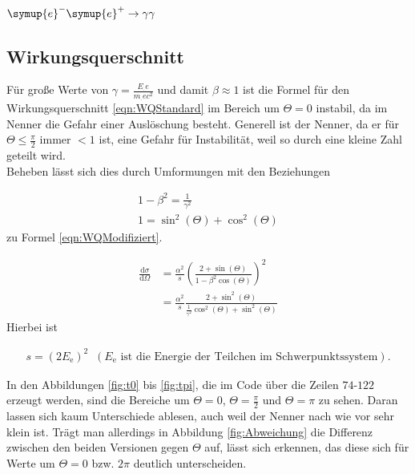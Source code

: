 \newpage

\section{\texorpdfstring{$\symup{e}^-\symup{e}^+\rightarrow\gamma \gamma$}{Paarvernichtung}}
\subsection{Wirkungsquerschnitt}
Für große Werte von $\gamma=\frac{E_.e}{m_.ec^2}$ und damit $\beta\approx 1$ ist die Formel für den Wirkungsquerschnitt \eqref{eqn:WQStandard} im Bereich um $\Theta=0$ instabil, da im Nenner die Gefahr einer Auslöschung besteht. Generell ist der Nenner, da er für $\Theta\leq \frac{\pi}{2}$ immer $<1$ ist, eine Gefahr für Instabilität, weil so durch eine kleine Zahl geteilt wird.\\
Beheben lässt sich dies durch Umformungen mit den Beziehungen

\begin{gather}
  1-\beta^2=\frac{1}{\gamma^2}\nonumber\\
  1=\sin^2(\Theta)+\cos^2(\Theta)\nonumber
\end{gather}
zu Formel \eqref{eqn:WQModifiziert}.

\begin{align}
    \frac{\mathrm{d}\sigma}{\mathrm{d}\Omega} &= \frac{\alpha^2}{s} \left(\frac{2+\sin(\Theta)}{1-\beta^2 \cos(\Theta)}\right)^2\label{eqn:WQStandard}\\
&= \frac{\alpha^2}{s}\frac{2+\sin^2(\Theta)}{\frac{1}{\gamma^2}\cos^2(\Theta)+\sin^2(\Theta)}\label{eqn:WQModifiziert}
\end{align}
Hierbei ist

\begin{gather}
  s=(2E_\text{e})^2 \;\;(E_\text{e} \text{ ist die Energie der Teilchen im Schwerpunktssystem})\text{.}\nonumber
\end{gather}

\noindent In den Abbildungen \ref{fig:t0} bis \ref{fig:tpi}, die im Code über die Zeilen $74$-$122$ erzeugt werden, sind die Bereiche um $\Theta=0$, $\Theta=\frac{\pi}{2}$ und $\Theta=\pi$ zu sehen.
Daran lassen sich kaum Unterschiede ablesen, auch weil der Nenner nach wie vor sehr klein ist. Trägt man allerdings in Abbildung \ref{fig:Abweichung} die Differenz zwischen den beiden Versionen gegen $\Theta$ auf, lässt sich erkennen, das diese sich für Werte um $\Theta=0$ bzw. $2\pi$ deutlich unterscheiden.

